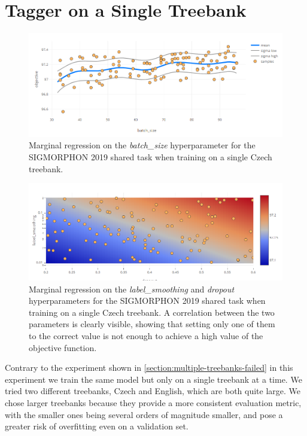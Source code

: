 \section{Tagger on a Single Treebank}
\label{section:exp-cestina}


\begin{figure}
	\begin{center}
		\includegraphics[width=1.0\textwidth]{images/czech-batch-size.png}
		\caption{Marginal regression on the \emph{batch\_size} hyperparameter for the SIGMORPHON 2019 shared task when training on a single Czech treebank.}
		\label{figure:czech-batch-size}
	\end{center}
\end{figure}


\begin{figure}
	\begin{center}
		\includegraphics[width=1.0\textwidth]{images/czech-2d-marginal.png}
		\caption{Marginal regression on the \emph{label\_smoothing} and \emph{dropout} hyperparameters for the SIGMORPHON 2019 shared task when training on a single Czech treebank. A correlation between the two parameters is clearly visible, showing that setting only one of them to the correct value is not enough to achieve a high value of the objective function.}
		\label{figure:czech-2d-marginal}
	\end{center}
\end{figure}

Contrary to the experiment shown in \autoref{section:multiple-treebanks-failed} in this experiment we train the same model but only on a single treebank at a time. We tried two different treebanks, Czech and English, which are both quite large. We chose larger treebanks because they provide a more consistent evaluation metric, with the smaller ones being several orders of magnitude smaller, and pose a greater risk of overfitting even on a validation set.

